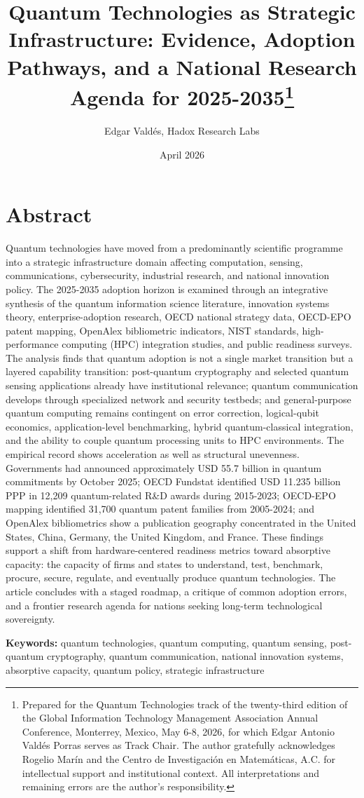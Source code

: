 \documentclass[
  11pt,
  letterpaper,
]{article}
\title{Quantum Technologies as Strategic Infrastructure: Evidence,
Adoption Pathways, and a National Research Agenda for
2025-2035\thanks{Prepared for the Quantum Technologies track of the
twenty-third edition of the Global Information Technology Management
Association Annual Conference, Monterrey, Mexico, May 6-8, 2026, for
which Edgar Antonio Valdés Porras serves as Track Chair. The author
gratefully acknowledges Rogelio Marín and the Centro de Investigación en
Matemáticas, A.C. for intellectual support and institutional context.
All interpretations and remaining errors are the author's
responsibility.}}
\author{Edgar Valdés, Hadox Research Labs}
\date{April 2026}
\begin{document}
\maketitle

\section{Abstract}\label{abstract}

Quantum technologies have moved from a predominantly scientific
programme into a strategic infrastructure domain affecting computation,
sensing, communications, cybersecurity, industrial research, and
national innovation policy. The 2025-2035 adoption horizon is examined
through an integrative synthesis of the quantum information science
literature, innovation systems theory, enterprise-adoption research,
OECD national strategy data, OECD-EPO patent mapping, OpenAlex
bibliometric indicators, NIST standards, high-performance computing
(HPC) integration studies, and public readiness surveys. The analysis
finds that quantum adoption is not a single market transition but a
layered capability transition: post-quantum cryptography and selected
quantum sensing applications already have institutional relevance;
quantum communication develops through specialized network and security
testbeds; and general-purpose quantum computing remains contingent on
error correction, logical-qubit economics, application-level
benchmarking, hybrid quantum-classical integration, and the ability to
couple quantum processing units to HPC environments. The empirical
record shows acceleration as well as structural unevenness. Governments
had announced approximately USD 55.7 billion in quantum commitments by
October 2025; OECD Fundstat identified USD 11.235 billion PPP in 12,209
quantum-related R\&D awards during 2015-2023; OECD-EPO mapping
identified 31,700 quantum patent families from 2005-2024; and OpenAlex
bibliometrics show a publication geography concentrated in the United
States, China, Germany, the United Kingdom, and France. These findings
support a shift from hardware-centered readiness metrics toward
absorptive capacity: the capacity of firms and states to understand,
test, benchmark, procure, secure, regulate, and eventually produce
quantum technologies. The article concludes with a staged roadmap, a
critique of common adoption errors, and a frontier research agenda for
nations seeking long-term technological sovereignty.

\textbf{Keywords:} quantum technologies, quantum computing, quantum
sensing, post-quantum cryptography, quantum communication, national
innovation systems, absorptive capacity, quantum policy, strategic
infrastructure
\end{document}
